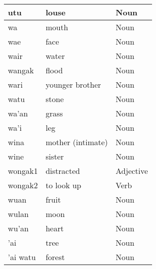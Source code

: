 \documentclass{article}
\begin{document}
\begin{longtable}{|l|l|l|}
utu                     & louse               & {\color[HTML]{009901} Noun}                        \\ \hline
wa                      & mouth               & {\color[HTML]{009901} Noun}                        \\ \hline
wae                     & face                & {\color[HTML]{009901} Noun}                        \\ \hline
wair                    & water               & {\color[HTML]{009901} Noun}                        \\ \hline
wangak                  & flood               & {\color[HTML]{009901} Noun}                        \\ \hline
wari                    & younger brother     & {\color[HTML]{009901} Noun}                        \\ \hline
watu                    & stone               & {\color[HTML]{009901} Noun}                        \\ \hline
wa'an                   & grass               & {\color[HTML]{009901} Noun}                        \\ \hline
wa'i                    & leg                 & {\color[HTML]{009901} Noun}                        \\ \hline
wina                    & mother (intimate)   & {\color[HTML]{009901} Noun}                        \\ \hline
wine                    & sister              & {\color[HTML]{009901} Noun}                        \\ \hline
wongak1                 & distracted          & {\color[HTML]{009901} Adjective}                   \\ \hline
wongak2                 & to look up          & {\color[HTML]{009901} Verb}                        \\ \hline
wuan                    & fruit               & {\color[HTML]{009901} Noun}                        \\ \hline
wulan                   & moon                & {\color[HTML]{009901} Noun}                        \\ \hline
wu'an                   & heart               & {\color[HTML]{009901} Noun}                        \\ \hline
'ai                     & tree                & {\color[HTML]{009901} Noun}                        \\ \hline
'ai watu                & forest              & {\color[HTML]{009901} Noun}                        \\ \hline

\end{longtable}
\end{document}
